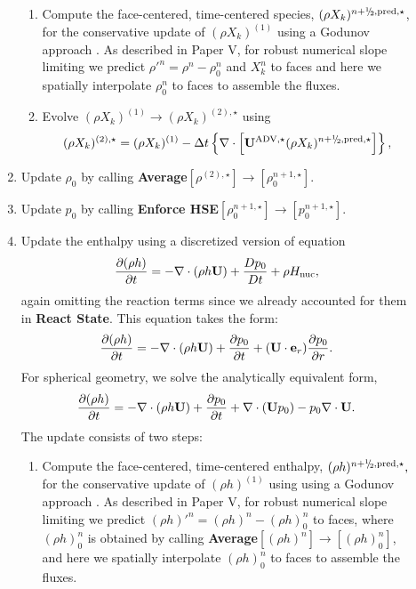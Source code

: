 \begin{description}
\begin{enumerate}
\begin{enumerate}
\item Compute the face-centered, time-centered species, $(\rho X_k)^{\nph,\pred,\star}$,
  for the conservative update of $(\rho X_k)^{(1)}$ using a Godunov approach \citep{XRB_III}.
  As described in Paper V, for robust numerical slope limiting we predict 
  $\rho'^n=\rho^n-\rho_0^n$ and $X_k^n$ to faces
  and here we spatially interpolate $\rho_0^n$ to faces to assemble the fluxes.

\item Evolve $(\rho X_k)^{(1)} \rightarrow (\rho X_k)^{(2),\star}$ using
\begin{equation}
(\rho X_k)^{(2),\star} = (\rho X_k)^{(1)}
  - \dt \left\{ \nabla \cdot \left[ \uadvone (\rho X_k)^{\nph,\pred,\star} \right] \right\},
\end{equation}

\end{enumerate}

\item Update $\rho_0$ by calling {\bf Average}$[\rho^{(2),\star}]\rightarrow[\rho_0^{n+1,\star}]$.

\item Update $p_0$ by calling {\bf Enforce HSE}$[\rho_0^{n+1,\star}] \rightarrow [p_0^{n+1,\star}]$.

\item Update the enthalpy using a discretized version of equation
%
\begin{equation}
\frac{\partial(\rho h)}{\partial t} = -\nabla\cdot(\rho h\Ub) + \frac{Dp_0}{Dt} + \rho\Hnuc,
\end{equation}
%
again omitting the reaction terms since we already accounted for
them in {\bf React State}.  This equation takes the form:
\begin{equation}
\frac{\partial (\rho h)}{\partial t}  = - \nabla \cdot (\rho h\Ub) + \frac{\partial p_0}{\partial t} + (\Ub \cdot \eb_r) \frac{\partial p_0}{\partial r}.
\end{equation}
For spherical geometry, we solve the analytically equivalent form,
\begin{equation}
\frac{\partial (\rho h)}{\partial t}  = - \nabla \cdot (\rho h\Ub) + \frac{\partial p_0}{\partial t} + \nabla \cdot (\Ub p_0) - p_0 \nabla \cdot \Ub.
\end{equation}
The update consists of two steps:

\begin{enumerate}
\renewcommand{\labelenumii}{{\bf \roman{enumii}}.}

\item Compute the face-centered, time-centered enthalpy, $(\rho h)^{\nph,\pred,\star},$
  for the conservative update of $(\rho h)^{(1)}$ using using a Godunov approach \citep{XRB_III}.
  As described in Paper V, for robust numerical slope limiting 
  we predict $(\rho h)'^n=(\rho h)^n-(\rho h)_0^n$ to faces,
  where $(\rho h)_0^n$ is obtained by calling {\bf Average}$[(\rho h)^n]\rightarrow[(\rho h)_0^n]$,
  and here we spatially interpolate $(\rho h)_0^n$ to faces to assemble the fluxes.


\end{enumerate}
\end{enumerate}
\end{description}
